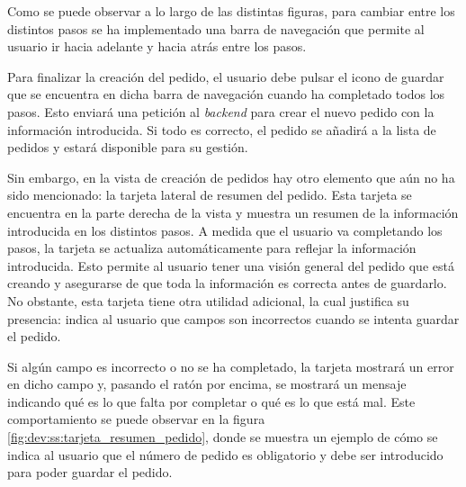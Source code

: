 Como se puede observar a lo largo de las distintas figuras, para cambiar entre los distintos pasos se ha implementado una barra de navegación que permite al usuario ir hacia adelante y hacia atrás entre los pasos.

Para finalizar la creación del pedido, el usuario debe pulsar el icono de guardar que se encuentra en dicha barra de navegación cuando ha completado todos los pasos. Esto enviará una petición al \textit{backend} para crear el nuevo pedido con la información introducida. Si todo es correcto, el pedido se añadirá a la lista de pedidos y estará disponible para su gestión.

Sin embargo, en la vista de creación de pedidos hay otro elemento que aún no ha sido mencionado: la tarjeta lateral de resumen del pedido. Esta tarjeta se encuentra en la parte derecha de la vista y muestra un resumen de la información introducida en los distintos pasos. A medida que el usuario va completando los pasos, la tarjeta se actualiza automáticamente para reflejar la información introducida. Esto permite al usuario tener una visión general del pedido que está creando y asegurarse de que toda la información es correcta antes de guardarlo. No obstante, esta tarjeta tiene otra utilidad adicional, la cual justifica su presencia: indica al usuario que campos son incorrectos cuando se intenta guardar el pedido.

Si algún campo es incorrecto o no se ha completado, la tarjeta mostrará un error en dicho campo y, pasando el ratón por encima, se mostrará un mensaje indicando qué es lo que falta por completar o qué es lo que está mal. Este comportamiento se puede observar en la figura \ref{fig:dev:ss:tarjeta_resumen_pedido}, donde se muestra un ejemplo de cómo se indica al usuario que el número de pedido es obligatorio y debe ser introducido para poder guardar el pedido.

